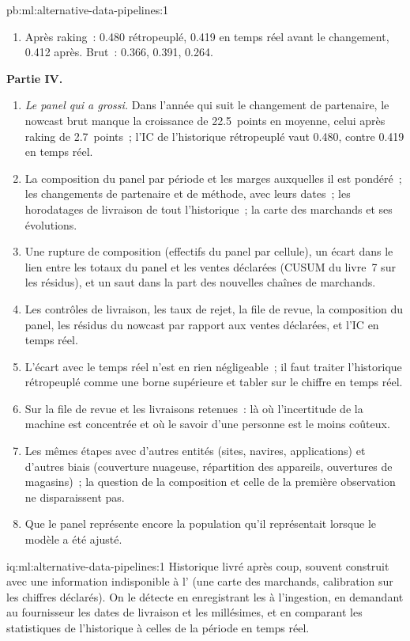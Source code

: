 \begin{solution}{pb:ml:alternative-data-pipelines:1}
\begin{enumerate}[resume]
\item Après raking~: 0.480 rétropeuplé, 0.419 en temps réel avant le changement, 0.412 après. Brut~: 0.366, 0.391, 0.264.
\end{enumerate}
\textbf{Partie IV.}
\begin{enumerate}[resume]
\item \emph{Le panel qui a grossi.} Dans l'année qui suit le changement de partenaire, le nowcast brut manque la croissance de 22.5~points en
moyenne, celui après raking de 2.7~points~; l'IC de l'historique rétropeuplé vaut 0.480, contre 0.419 en temps réel.
\item La composition du panel par période et les marges auxquelles il est pondéré~; les changements de partenaire et de méthode, avec leurs dates~;
les horodatages de livraison de tout l'historique~; la carte des marchands et ses évolutions.
\item Une rupture de composition (effectifs du panel par cellule), un écart dans le lien entre les totaux du panel et les ventes déclarées (CUSUM du livre~7 sur
les résidus), et un saut dans la part des nouvelles chaînes de marchands.
\item Les contrôles de livraison, les taux de rejet, la file de revue, la composition du panel, les résidus du nowcast par rapport aux ventes déclarées, et
l'IC en temps réel.
\item L'écart avec le temps réel n'est en rien négligeable~; il faut traiter l'historique rétropeuplé comme une borne supérieure et tabler sur le chiffre en temps réel.
\item Sur la file de revue et les livraisons retenues~: là où l'incertitude de la machine est concentrée et où le savoir d'une personne
est le moins coûteux.
\item Les mêmes étapes avec d'autres entités (sites, navires, applications) et d'autres biais (couverture nuageuse, répartition des appareils, ouvertures de
magasins)~; la question de la composition et celle de la première observation ne disparaissent pas.
\item Que le panel représente encore la population qu'il représentait lorsque le modèle a été ajusté.
\end{enumerate}
\end{solution}

\begin{solution}{iq:ml:alternative-data-pipelines:1}
Historique livré après coup, souvent construit avec une information indisponible à l' (une carte des marchands, calibration sur
les chiffres déclarés). On le détecte en enregistrant les  à l'ingestion, en demandant au fournisseur les dates de livraison et
les millésimes, et en comparant les statistiques de l'historique à celles de la période en temps réel.
\end{solution}

